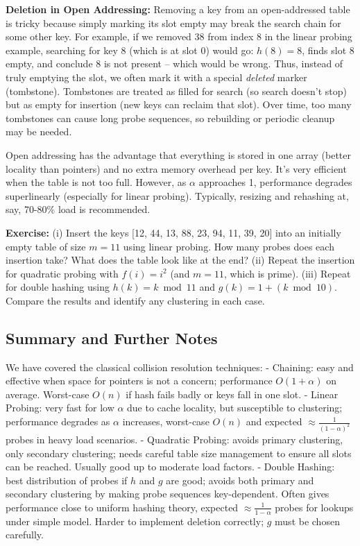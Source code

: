 \documentclass[11pt]{article}
\begin{document}
\textbf{Deletion in Open Addressing:} Removing a key from an open-addressed table is tricky because simply marking its slot empty may break the search chain for some other key. For example, if we removed 38 from index 8 in the linear probing example, searching for key 8 (which is at slot 0) would go: $h(8)=8$, finds slot 8 empty, and conclude 8 is not present – which would be wrong. Thus, instead of truly emptying the slot, we often mark it with a special \emph{deleted} marker (tombstone). Tombstones are treated as filled for search (so search doesn’t stop) but as empty for insertion (new keys can reclaim that slot). Over time, too many tombstones can cause long probe sequences, so rebuilding or periodic cleanup may be needed.

Open addressing has the advantage that everything is stored in one array (better locality than pointers) and no extra memory overhead per key. It’s very efficient when the table is not too full. However, as $\alpha$ approaches 1, performance degrades superlinearly (especially for linear probing). Typically, resizing and rehashing at, say, 70-80\% load is recommended.

\textbf{Exercise:} (i) Insert the keys [12, 44, 13, 88, 23, 94, 11, 39, 20] into an initially empty table of size $m=11$ using linear probing. How many probes does each insertion take? What does the table look like at the end? (ii) Repeat the insertion for quadratic probing with $f(i)=i^2$ (and $m=11$, which is prime). (iii) Repeat for double hashing using $h(k)=k \bmod 11$ and $g(k)=1 + (k \bmod 10)$. Compare the results and identify any clustering in each case.

\subsection{Summary and Further Notes}
We have covered the classical collision resolution techniques:
- Chaining: easy and effective when space for pointers is not a concern; performance $O(1+\alpha)$ on average. Worst-case $O(n)$ if hash fails badly or keys fall in one slot.
- Linear Probing: very fast for low $\alpha$ due to cache locality, but susceptible to clustering; performance degrades as $\alpha$ increases, worst-case $O(n)$ and expected $\approx \frac{1}{(1-\alpha)^2}$ probes in heavy load scenarios.
- Quadratic Probing: avoids primary clustering, only secondary clustering; needs careful table size management to ensure all slots can be reached. Usually good up to moderate load factors.
- Double Hashing: best distribution of probes if $h$ and $g$ are good; avoids both primary and secondary clustering by making probe sequences key-dependent. Often gives performance close to uniform hashing theory, expected $\approx \frac{1}{1-\alpha}$ probes for lookups under simple model. Harder to implement deletion correctly; $g$ must be chosen carefully.
\end{document}
